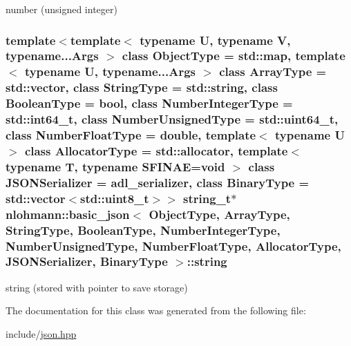 number (unsigned integer) 

\subsubsection[{\texorpdfstring{string}{string}}]{\setlength{\rightskip}{0pt plus 5cm}template$<$template$<$ typename U, typename V, typename...\+Args $>$ class Object\+Type = std\+::map, template$<$ typename U, typename...\+Args $>$ class Array\+Type = std\+::vector, class String\+Type  = std\+::string, class Boolean\+Type  = bool, class Number\+Integer\+Type  = std\+::int64\+\_\+t, class Number\+Unsigned\+Type  = std\+::uint64\+\_\+t, class Number\+Float\+Type  = double, template$<$ typename U $>$ class Allocator\+Type = std\+::allocator, template$<$ typename T, typename S\+F\+I\+N\+A\+E=void $>$ class J\+S\+O\+N\+Serializer = adl\+\_\+serializer, class Binary\+Type  = std\+::vector$<$std\+::uint8\+\_\+t$>$$>$ {\bf string\+\_\+t}$\ast$ {\bf nlohmann\+::basic\+\_\+json}$<$ Object\+Type, Array\+Type, String\+Type, Boolean\+Type, Number\+Integer\+Type, Number\+Unsigned\+Type, Number\+Float\+Type, Allocator\+Type, J\+S\+O\+N\+Serializer, Binary\+Type $>$\+::string\hspace{0.3cm}{\ttfamily [private]}}\hypertarget{classnlohmann_1_1basic__json_ac32019eb29dc7bb4c326a233e0e2f0cb}{}\label{classnlohmann_1_1basic__json_ac32019eb29dc7bb4c326a233e0e2f0cb}


string (stored with pointer to save storage) 



The documentation for this class was generated from the following file\+:\begin{DoxyCompactItemize}
\item 
include/\hyperlink{json_8hpp}{json.\+hpp}\end{DoxyCompactItemize}
